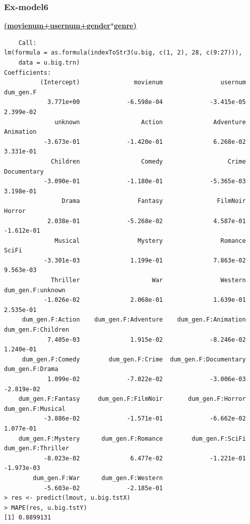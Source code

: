 \documentclass[11pt]{article}
\begin{document}
\subsubsection{Ex-model6}
\textbf{\underline{(movienum+usernum+gender$*$genre)}}
\begin{verbatim}
    Call:
lm(formula = as.formula(indexToStr3(u.big, c(1, 2), 28, c(9:27))), 
    data = u.big.trn)
Coefficients:
          (Intercept)               movienum                usernum              dum_gen.F  
            3.771e+00             -6.598e-04             -3.415e-05              2.399e-02  
              unknown                 Action              Adventure              Animation  
           -3.673e-01             -1.420e-01              6.268e-02              3.331e-01  
             Children                 Comedy                  Crime            Documentary  
           -3.090e-01             -1.180e-01             -5.365e-03              3.198e-01  
                Drama                Fantasy               FilmNoir                 Horror  
            2.038e-01             -5.268e-02              4.587e-01             -1.612e-01  
              Musical                Mystery                Romance                  SciFi  
           -3.301e-03              1.199e-01              7.863e-02              9.563e-03  
             Thriller                    War                Western      dum_gen.F:unknown  
           -1.026e-02              2.068e-01              1.639e-01              2.535e-01  
     dum_gen.F:Action    dum_gen.F:Adventure    dum_gen.F:Animation     dum_gen.F:Children  
            7.405e-03              1.915e-02             -8.246e-02              1.240e-01  
     dum_gen.F:Comedy        dum_gen.F:Crime  dum_gen.F:Documentary        dum_gen.F:Drama  
            1.099e-02             -7.022e-02             -3.006e-03             -2.819e-02  
    dum_gen.F:Fantasy     dum_gen.F:FilmNoir       dum_gen.F:Horror      dum_gen.F:Musical  
           -3.886e-02             -1.571e-01             -6.662e-02              1.077e-01  
    dum_gen.F:Mystery      dum_gen.F:Romance        dum_gen.F:SciFi     dum_gen.F:Thriller  
           -8.023e-02              6.477e-02             -1.221e-01             -1.973e-03  
        dum_gen.F:War      dum_gen.F:Western  
           -5.603e-02             -2.185e-01  
> res <- predict(lmout, u.big.tstX)
> MAPE(res, u.big.tstY)
[1] 0.8899131
\end{verbatim}
\end{document}
